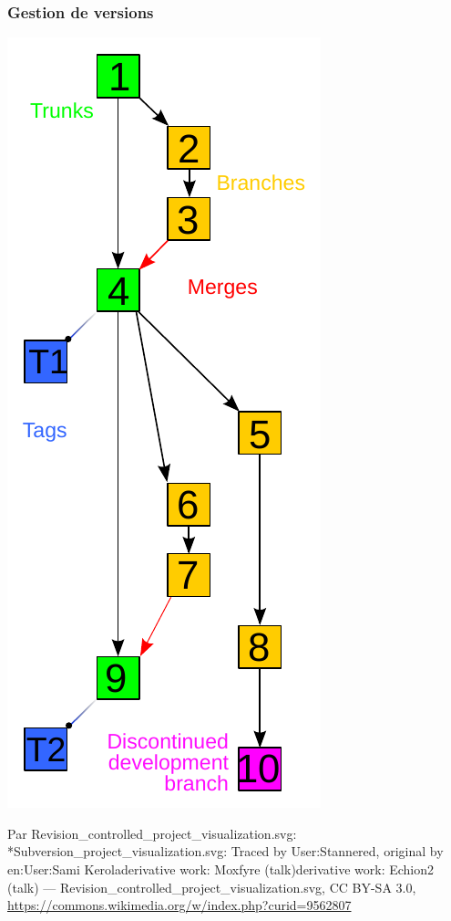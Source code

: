 \documentclass[table,tikz,12pt,svgnames]{beamer}
\begin{document}
\begin{frame}
	\frametitle{Gestion de versions}
	\vspace{-2em}
	\begin{block}{}
    \begin{adjustwidth}{-5.5cm}{-0.5cm}{}
		\begin{center}
		{\includegraphics[scale=0.58]{images/gestion_versions.pdf}}
		\end{center}
	\end{adjustwidth}
	\vspace{-4em}
    \begin{adjustwidth}{5.0cm}{-1.5cm}{}
	\tiny Par Revision\_controlled\_project\_visualization.svg: *Subversion\_project\_visualization.svg: Traced by User:Stannered, original by en:User:Sami Keroladerivative work: Moxfyre (talk)derivative work: Echion2 (talk) — Revision\_controlled\_project\_visualization.svg, CC BY-SA 3.0, \url{https://commons.wikimedia.org/w/index.php?curid=9562807}
	\end{adjustwidth}
	\end{block}
\end{frame}
\end{document}
